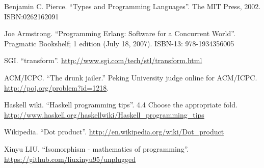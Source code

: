 \begin{thebibliography}{99}
Benjamin C. Pierce. ``Types and Programming Languages''. The MIT Press, 2002. ISBN:0262162091

Joe Armstrong. ``Programming Erlang: Software for a Concurrent World''. Pragmatic Bookshelf; 1 edition (July 18, 2007). ISBN-13: 978-1934356005

SGI. ``transform''. \url{http://www.sgi.com/tech/stl/transform.html}

ACM/ICPC. ``The drunk jailer.'' Peking University judge online for ACM/ICPC. \url{http://poj.org/problem?id=1218}.

Haskell wiki. ``Haskell programming tips''. 4.4 Choose the appropriate fold. \url{http://www.haskell.org/haskellwiki/Haskell_programming_tips}

Wikipedia. ``Dot product''. \url{http://en.wikipedia.org/wiki/Dot_product}

Xinyu LIU. ``Isomorphism - mathematics of programming''. \url{https://github.com/liuxinyu95/unplugged}

\end{thebibliography}
